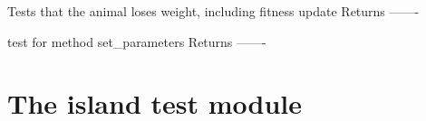 \documentclass[a4paper,10pt,english]{sphinxmanual}
\begin{document}
\begin{fulllineitems}

\begin{fulllineitems}
\label{\detokenize{tests:biosim.tests.test_animals.TestAnimal.test_loss_of_weight}}
Tests that the animal loses weight, including fitness update
Returns
-------

\end{fulllineitems}


\begin{fulllineitems}
\label{\detokenize{tests:biosim.tests.test_animals.TestAnimal.test_set_parameters}}
test for method set\_parameters
Returns
-------

\end{fulllineitems}


\end{fulllineitems}



\section{The island test module}
\label{\detokenize{tests:the-island-test-module}}\label{\detokenize{tests:module-biosim.tests.test_island}}
\end{document}
